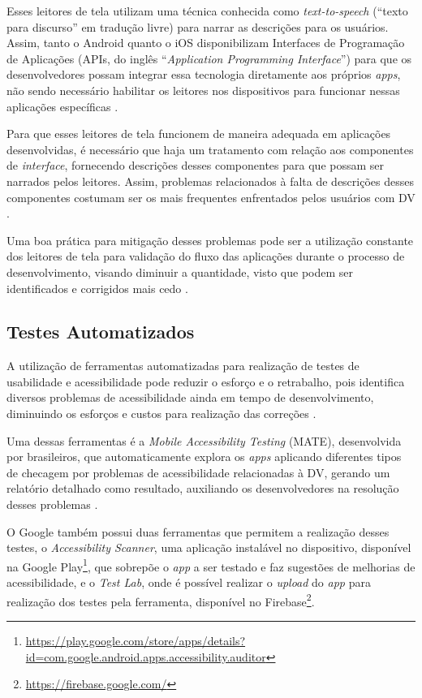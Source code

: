 Esses leitores de tela utilizam uma técnica conhecida como \emph{text-to-speech} (``texto para discurso'' em tradução livre) para narrar as descrições para
os usuários. Assim, tanto o Android quanto o iOS disponibilizam Interfaces de Programação de Aplicações
(APIs, do inglês ``\emph{Application Programming Interface}'') para que os desenvolvedores possam integrar essa tecnologia diretamente aos
próprios \emph{apps}, não sendo necessário habilitar os leitores nos dispositivos para funcionar nessas aplicações específicas
\cite{Heesook2017,Biase2018,Oliveira2019,Caballero2020}.

Para que esses leitores de tela funcionem de maneira adequada em aplicações desenvolvidas, é necessário que haja um tratamento
com relação aos componentes de \emph{interface}, fornecendo descrições desses componentes para que possam ser narrados pelos leitores. Assim,
problemas relacionados à falta de descrições desses componentes costumam ser os mais frequentes enfrentados pelos usuários com DV
\cite{Vendome201941,Christoph2020,Shera2021285}.

Uma boa prática para mitigação desses problemas pode ser a utilização constante dos leitores de tela para validação do fluxo das aplicações durante
o processo de desenvolvimento, visando diminuir a quantidade, visto que podem ser identificados e corrigidos mais cedo \cite{Tomlinson2016377}.

\subsection{Testes Automatizados}

A utilização de ferramentas automatizadas para realização de testes de usabilidade e acessibilidade pode reduzir o esforço
e o retrabalho, pois identifica diversos problemas de acessibilidade ainda em tempo de desenvolvimento, diminuindo os esforços e custos para
realização das correções \cite{Christoph2020}.

Uma dessas ferramentas é a \emph{Mobile Accessibility Testing} (MATE), desenvolvida por brasileiros, que automaticamente explora os \emph{apps}
aplicando diferentes tipos de checagem por problemas de acessibilidade relacionadas à DV, gerando um relatório detalhado como resultado, auxiliando
os desenvolvedores na resolução desses problemas \cite{Eler2018AutomatedAT}.

O Google também possui duas ferramentas que permitem a realização desses testes, o \emph{Accessibility Scanner}, uma aplicação instalável no dispositivo,
disponível na Google Play\footnote{\url{https://play.google.com/store/apps/details?id=com.google.android.apps.accessibility.auditor}}, que sobrepõe o
\emph{app} a ser testado e faz sugestões de melhorias de acessibilidade, e o \emph{Test Lab}, onde é possível realizar o \emph{upload} do \emph{app} para 
realização dos testes pela ferramenta, disponível no Firebase\footnote{\url{https://firebase.google.com/}}.

